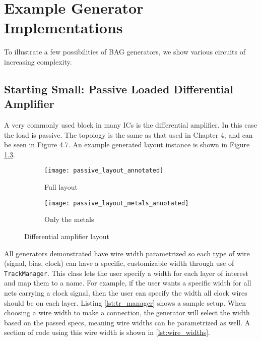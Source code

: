 \chapter{Example Generator Implementations}
To illustrate a few possibilities of BAG generators, we show various circuits of increasing complexity. 
\section{Starting Small: Passive Loaded Differential Amplifier}
A very commonly used block in many ICs is the differential amplifier. In this case the load is passive. The topology is the same as that used in Chapter 4, and can be seen in Figure 4.7. An example generated layout instance is shown in Figure \ref{fig:passive_amp}.
\begin{figure}[h]
\centering
\begin{subfigure}{.8\linewidth}
  \centering
  \texttt{[image: passive\_layout\_annotated]}
  \caption{Full layout}
  \label{fig:sfig1}
\end{subfigure}
\begin{subfigure}{.8\linewidth}
  \centering
\texttt{[image: passive\_layout\_metals\_annotated]}
  \caption{Only the metals}
  \label{fig:sfig2}
\end{subfigure}
\caption{Differential amplifier layout}
\label{fig:passive_amp}
\end{figure}
All generators demonstrated have wire width parametrized so each type of wire (signal, bias, clock) can have a specific, customizable width through use of \texttt{TrackManager}. This class lets the user specify a width for each layer of interest and map them to a name. For example, if the user wants a specific width for all nets carrying a clock signal, then the user can specify the width all clock wires should be on each layer. Listing \ref{lst:tr_manager} shows a sample setup. When choosing a wire width to make a connection, the generator will select the width based on the passed specs, meaning wire widths can be parametrized as well. A section of code using this wire width is shown in \ref{lst:wire_widths}. 

